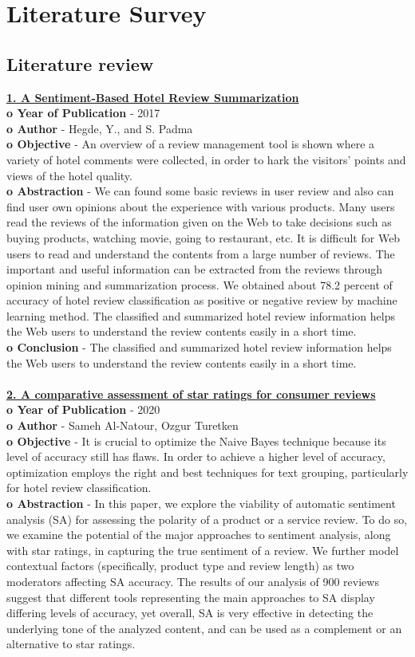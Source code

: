 \documentclass[a4paper, 12pt]{report}
\begin{document}
\chapter{Literature Survey}
\section{Literature review}
\underline{\textbf{1. A Sentiment-Based Hotel Review Summarization}}\\
\textbf{o	Year of Publication} - 2017\\
\textbf{o	Author} - Hegde, Y., and S. Padma \\
\textbf{o	Objective} - An overview of a review management tool is shown where a variety of hotel comments were collected, in order to hark the visitors’ points and views of the hotel quality.\\ 
\textbf{o   Abstraction} - We can found some basic reviews in user review and also can find user own opinions about the experience with various products. Many users read the reviews of the information given on the Web to take decisions such as buying products, watching movie, going to restaurant, etc. It is difficult for Web users to read and understand the contents from a large number of reviews. The important and useful information can be extracted from the reviews through opinion mining and summarization process. We obtained about 78.2 percent of accuracy of hotel review classification as positive or negative review by machine learning method. The classified and summarized hotel review information helps the Web users to understand the review contents easily in a short time.\\ 
\textbf{o	Conclusion} - The classified and summarized hotel review information helps the Web users to understand the review contents easily in a short time. 
\\
\\
\underline{\textbf{2. A comparative assessment of star ratings for consumer reviews}}\\
\textbf{o	Year of Publication} - 2020\\
\textbf{o	Author} - Sameh Al-Natour, Ozgur Turetken \\
\textbf{o	Objective} - It is crucial to optimize the Naive Bayes technique because its level of accuracy still has flaws. In 
order to achieve a higher level of accuracy, optimization employs the right and best techniques for text 
grouping, particularly for hotel review classification.\\ 
\textbf{o   Abstraction} - In this paper, we explore the viability of automatic sentiment analysis (SA) for assessing the polarity of a product or a service review. To do so, we examine the potential of the major approaches to sentiment analysis, along with star ratings, in capturing the true sentiment of a review. We further model contextual factors (specifically, product type and review length) as two moderators affecting SA accuracy. The results of our analysis of 900 reviews suggest that different tools representing the main approaches to SA display differing levels of accuracy, yet overall, SA is very effective in detecting the underlying tone of the analyzed content, and can be used as a complement or an alternative to star ratings.\\ 
\end{document}
